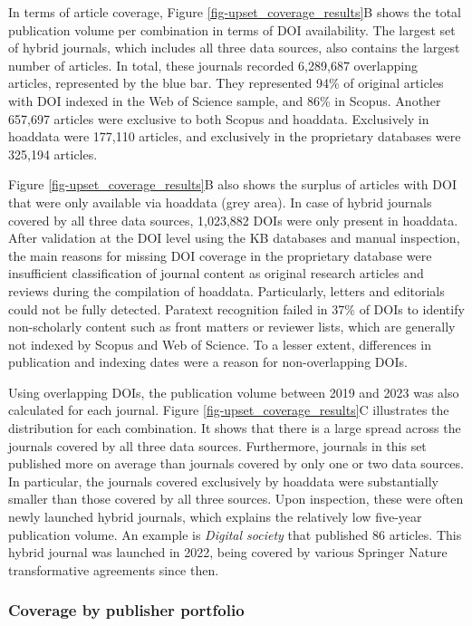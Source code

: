 \documentclass[a4paper,man,floatsintext,longtable,noextraspace,10pt]{apa6}
\begin{document}
In terms of article coverage, Figure \ref{fig-upset_coverage_results}B
shows the total publication volume per combination in terms of DOI
availability. The largest set of hybrid journals, which includes all
three data sources, also contains the largest number of articles. In
total, these journals recorded 6,289,687 overlapping articles,
represented by the blue bar. They represented 94\% of original articles
with DOI indexed in the Web of Science sample, and 86\% in Scopus.
Another 657,697 articles were exclusive to both Scopus and hoaddata.
Exclusively in hoaddata were 177,110 articles, and exclusively in the
proprietary databases were 325,194 articles.

Figure \ref{fig-upset_coverage_results}B also shows the surplus of
articles with DOI that were only available via hoaddata (grey area). In
case of hybrid journals covered by all three data sources, 1,023,882
DOIs were only present in hoaddata. After validation at the DOI level
using the KB databases and manual inspection, the main reasons for
missing DOI coverage in the proprietary database were insufficient
classification of journal content as original research articles and
reviews during the compilation of hoaddata. Particularly, letters and
editorials could not be fully detected. Paratext recognition failed in
37\% of DOIs to identify non-scholarly content such as front matters or
reviewer lists, which are generally not indexed by Scopus and Web of
Science. To a lesser extent, differences in publication and indexing
dates were a reason for non-overlapping DOIs.

Using overlapping DOIs, the publication volume between 2019 and 2023 was
also calculated for each journal. Figure
\ref{fig-upset_coverage_results}C illustrates the distribution for each
combination. It shows that there is a large spread across the journals
covered by all three data sources. Furthermore, journals in this set
published more on average than journals covered by only one or two data
sources. In particular, the journals covered exclusively by hoaddata
were substantially smaller than those covered by all three sources. Upon
inspection, these were often newly launched hybrid journals, which
explains the relatively low five-year publication volume. An example is
\emph{Digital society} that published 86 articles. This hybrid journal
was launched in 2022, being covered by various Springer Nature
transformative agreements since then.

\subsubsection{Coverage by publisher
portfolio}\label{coverage-by-publisher-portfolio}
\end{document}
